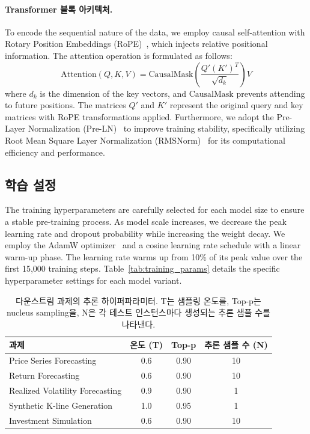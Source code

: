\paragraph{Transformer 블록 아키텍처.} To encode the sequential nature of the data, we employ causal self-attention with Rotary Position Embeddings (RoPE)~\cite{su2024roformer}, which injects relative positional information. The attention operation is formulated as follows:
\begin{equation}
    \text{Attention}(Q, K, V) = \text{CausalMask}\left(\frac{Q' (K')^T}{\sqrt{d_k}}\right)V
\end{equation}
where $d_k$ is the dimension of the key vectors, and $\text{CausalMask}$ prevents attending to future positions. The matrices $Q'$ and $K'$ represent the original query and key matrices with RoPE transformations applied. Furthermore, we adopt the Pre-Layer Normalization (Pre-LN)~\cite{xiong2020layer} to improve training stability, specifically utilizing Root Mean Square Layer Normalization (RMSNorm)~\cite{zhang2019root} for its computational efficiency and performance.

\subsection{학습 설정}
The training hyperparameters are carefully selected for each model size to ensure a stable pre-training process. As model scale increases, we decrease the peak learning rate and dropout probability while increasing the weight decay. We employ the AdamW optimizer~\cite{loshchilov2017decoupled} and a cosine learning rate schedule with a linear warm-up phase. The learning rate warms up from 10\% of its peak value over the first 15,000 training steps. Table~\ref{tab:training_params} details the specific hyperparameter settings for each model variant.

\begin{table}[t!]
\centering
\setlength{\tabcolsep}{4pt}

\begin{tabular}{lccc}
\toprule
\textbf{과제} & \textbf{온도 (T)} & \textbf{Top-p} & \textbf{추론 샘플 수 (N)} \\
\midrule
Price Series Forecasting      & 0.6 & 0.90 & 10 \\
Return Forecasting            & 0.6 & 0.90 & 10 \\
Realized Volatility Forecasting & 0.9 & 0.90 & 1 \\
Synthetic K-line Generation      & 1.0 & 0.95 & 1 \\
Investment  Simulation        & 0.6 & 0.90 & 10 \\
\bottomrule
\end{tabular}
\caption{다운스트림 과제의 추론 하이퍼파라미터. T는 샘플링 온도를, Top-p는 nucleus sampling을, N은 각 테스트 인스턴스마다 생성되는 추론 샘플 수를 나타낸다.}
\label{tab:inference_hyperparams}
\end{table}

